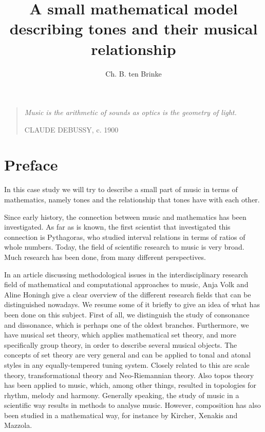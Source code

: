 \documentclass[a4paper]{book}
\title{A small mathematical model describing tones and their musical relationship}
\author{Ch. B. ten Brinke}
\theoremstyle{definition}
\begin{document}
\maketitle

\vspace*{\fill}
\thispagestyle{empty} %
\begin{quotation}
    \em %
    \Large{Music is the arithmetic of sounds as optics is the geometry of light.}

    \medskip
    \raggedleft
    CLAUDE DEBUSSY, c. 1900
\end{quotation}
\vspace*{\fill}

\tableofcontents


\chapter*{Preface}
In this case study we will try to describe a small part of music in terms of mathematics, namely tones and the relationship that tones have with each other.

Since early history, the connection between music and mathematics has been investigated.
As far as is known, the first scientist that investigated this connection is Pythagoras, who studied interval relations in terms of ratios of whole numbers.
Today, the field of scientific research to music is very broad.
Much research has been done, from many different perspectives.

In an article discussing methodological issues in the interdisciplinary research field of mathematical and computational approaches to music, Anja Volk and Aline Honingh give a clear overview of the different research fields that can be distinguished nowadays.
\cite{VolkHoningh}
We resume some of it briefly to give an idea of what has been done on this subject.
First of all, we distinguish the study of consonance and dissonance, which is perhaps one of the oldest branches.
Furthermore, we have musical set theory, which applies mathematical set theory, and more specifically group theory, in order to describe several musical objects.
The concepts of set theory are very general and can be applied to tonal and atonal styles in any equally-tempered tuning system.
Closely related to this are scale theory, transformational theory and Neo-Riemannian theory.
Also topos theory has been applied to music, which, among other things, resulted in topologies for rhythm, melody and harmony.
Generally speaking, the study of music in a scientific way results in methods to analyse music.
However, composition has also been studied in a mathematical way, for instance by Kircher, Xenakis and Mazzola.
\end{document}
